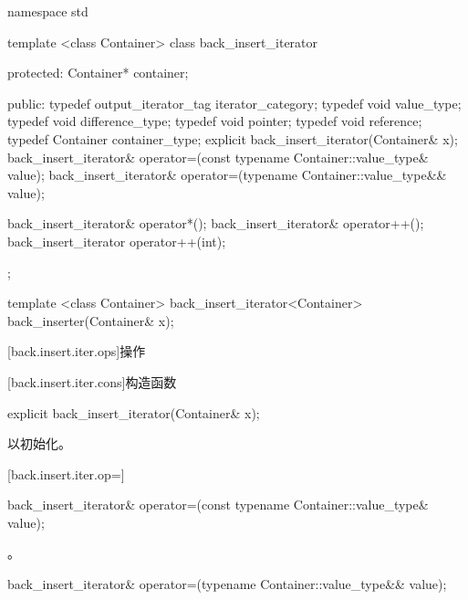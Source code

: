 %
\begin{codeblock}
namespace std {
  template <class Container>
  class back_insert_iterator {
  protected:
    Container* container;

  public:
    typedef output_iterator_tag iterator_category;
    typedef void value_type;
    typedef void difference_type;
    typedef void pointer;
    typedef void reference;
    typedef Container container_type;
    explicit back_insert_iterator(Container& x);
    back_insert_iterator& operator=(const typename Container::value_type& value);
    back_insert_iterator& operator=(typename Container::value_type&& value);

    back_insert_iterator& operator*();
    back_insert_iterator& operator++();
    back_insert_iterator  operator++(int);
  };

  template <class Container>
    back_insert_iterator<Container> back_inserter(Container& x);
}
\end{codeblock}

[back.insert.iter.ops]{操作}

[back.insert.iter.cons]{构造函数}

%
\begin{itemdecl}
explicit back_insert_iterator(Container& x);
\end{itemdecl}

\begin{itemdescr}
\pnum
\effects
以初始化。
\end{itemdescr}

[back.insert.iter.op=]{}

%
\begin{itemdecl}
back_insert_iterator& operator=(const typename Container::value_type& value);
\end{itemdecl}

\begin{itemdescr}
\pnum
\effects
{}

\pnum
\returns
{}。
\end{itemdescr}

%
\begin{itemdecl}
back_insert_iterator& operator=(typename Container::value_type&& value);
\end{itemdecl}

